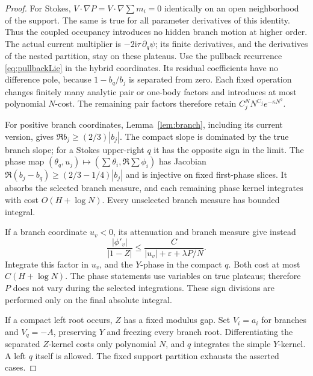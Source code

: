 \documentclass[11pt]{article}
\numberwithin{equation}{section}
\theoremstyle{definition}
\newcommand{\ii}{\mathrm i}
\newcommand{\eps}{\varepsilon}
\begin{document}
\begin{proof}
For Stokes, \(V\cdot\nabla P=V\cdot\nabla\sum m_i=0\) identically
on an open neighborhood of the support. The same is true for
all parameter derivatives of this identity. Thus the coupled
occupancy introduces no hidden branch motion at higher order.
The actual current multiplier is
\(-2\ii\tau\,\partial_q\psi\); its finite derivatives, and the
derivatives of the nested partition, stay on these plateaus.
Use the pullback recurrence \eqref{eq:pullbackLie} in the hybrid
coordinates. Its residual coefficients have no difference pole,
because \(1-b_q/b_j\) is separated from zero. Each fixed operation
changes finitely many analytic pair or one-body factors and
introduces at most polynomial \(N\)-cost. The remaining pair
factors therefore retain
\(C_j^N N^{C_j}e^{-\kappa N^2}\).

For positive branch coordinates, Lemma~\ref{lem:branch}, including
its current version, gives \(\Re b_j\ge(2/3)|b_j|\).
The compact slope is dominated by the true branch slope; for a
Stokes upper-right \(q\) it has the opposite sign in the limit.
The phase map
\((\theta_q,u_j)\mapsto(\sum\theta_i,\Re\sum\phi_i)\)
has Jacobian \(\Re(b_j-b_q)\ge(2/3-1/4)|b_j|\)
and is injective on fixed first-phase slices.
It absorbs the selected branch measure, and each remaining phase
kernel integrates with cost \(O(H+\log N)\).
Every unselected branch measure has bounded integral.

If a branch coordinate \(u_v<0\), its attenuation and branch measure
give instead
\[
 \frac{|\phi'_v|}{|1-Z|}
 \le\frac C{|u_v|+\eps+\lambda P/N}.
\]
Integrate this factor in \(u_v\), and the \(Y\)-phase in the compact
\(q\). Both cost at most \(C(H+\log N)\).
The phase statements use variables on true plateaus; therefore \(P\)
does not vary during the selected integrations.
These sign divisions are performed only on the final absolute integral.

If a compact left root occurs, \(Z\) has a fixed modulus gap.
Set \(V_i=a_i\) for branches and \(V_q=-A\), preserving \(Y\)
and freezing every branch root. Differentiating the separated
\(Z\)-kernel costs only polynomial \(N\), and \(q\) integrates
the simple \(Y\)-kernel. A left \(q\) itself is allowed.
The fixed support partition exhausts the asserted cases.
\end{proof}
\end{document}
